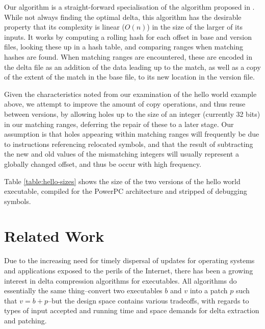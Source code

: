 \documentclass[10pt,twocolumn]{article}
\begin{document}
Our algorithm is a straight-forward specialisation of the algorithm proposed in
\cite{alinear}. While not always finding the optimal delta, this algorithm has
the desirable property that its complexity is linear ($O(n)$) in the size of the
larger of its inputs. It works by computing a rolling hash for each offset
in base and version files, looking these up in a hash table, and comparing
ranges when matching hashes are found. When matching ranges are encountered,
these are encoded in the delta file as an addition of the data leading up to the
match, as well as a copy of the extent of the match in the base file, to its new
location in the version file. 

Given the characteristics noted from our examination of the hello world example
above, we attempt to improve the amount of copy operations, and thus reuse
between versions, by allowing holes up to the size of an integer (currently 32
bits) in our matching ranges, deferring the repair of these to a later stage.
Our assumption is that holes appearing within matching ranges will frequently be
due to instructions referencing relocated symbols, and that the result of
subtracting the new and old values of the mismatching integers will usually
represent a globally changed offset, and thus be occur with high frequency.

Table \ref{table:hello-sizes} shows the size of the two versions of the hello
world executable, compiled for the PowerPC architecture and stripped of
debugging symbols. 

\section{Related Work}

Due to the increasing need for timely dispersal of updates for operating systems
and applications exposed to the perils of the Internet, there has been a growing
interest in delta compression algorithms for executables. All algorithms do
essentially the same thing--convert two executables $b$ and $v$ into a patch $p$
such that $v = b+p$--but the design space contains various tradeoffs, with
regards to types of input accepted and running time and space demands for delta
extraction and patching.
\end{document}
